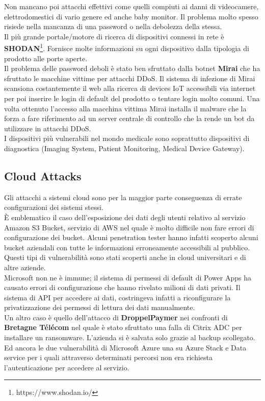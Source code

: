 Non mancano poi attacchi effettivi come quelli compiuti ai danni di videocamere, elettrodomestici di vario genere ed anche baby monitor.
Il problema molto spesso risiede nella mancanza di una password o nella debolezza della stessa.\\
Il più grande portale/motore di ricerca di dispositivi connessi in rete è \textbf{SHODAN}\footnote{https://www.shodan.io/}.
Fornisce molte informazioni su ogni dispositivo dalla tipologia di prodotto alle porte aperte.\\
Il problema delle password deboli è stato ben sfruttato dalla botnet \textbf{Mirai} che ha sfruttato le macchine vittime per attacchi \acrshort{DDoS}.
Il sistema di infezione di Mirai scansiona costantemente il web alla ricerca di devices \acrshort{IoT} accessibili via internet per poi inserire le login di default del prodotto o tentare login molto comuni.
Una volta ottenuto l'accesso alla macchina vittima Mirai installa il malware che la forza a fare riferimento ad un server centrale di controllo che la rende un bot da utilizzare in attacchi \acrshort{DDoS}.\\
I dispositivi più vulnerabili nel mondo medicale sono soprattutto dispositivi di diagnostica (Imaging System, Patient Monitoring, Medical Device Gateway).

\subsection{Cloud Attacks}
Gli attacchi a sistemi cloud sono per la maggior parte conseguenza di errate configurazioni dei sistemi stessi.\\
È emblematico il caso dell'esposizione dei dati degli utenti relativo al servizio Amazon S3 Bucket, servizio di \acrfull{AWS} nel quale è molto difficile non fare errori di configurazione dei bucket.
Alcuni penetration tester hanno infatti scoperto alcuni bucket aziendali con tutte le informazioni erroneamente accessibili al pubblico.
Questi tipi di vulnerabilità sono stati scoperti anche in cloud universitari e di altre aziende.\\
Microsoft non ne è immune; il sistema di permessi di default di Power Apps ha causato errori di configurazione che hanno rivelato milioni di dati privati.
Il sistema di \acrfull{API} per accedere ai dati, costringeva infatti a riconfigurare la privatizzazione dei permessi di lettura dei dati manualmente.\\
Un altro caso è quello dell'attacco di \textbf{DroppelPaymer} nei confronti di \textbf{Bretagne Télécom} nel quale è stato sfruttato una falla di Citrix ADC per installare un ransomware. L'azienda si è salvata solo grazie al backup scollegato.\\
Ed ancora le due vulnerabilità di Microsoft Azure una su Azure Stack e Data service per i quali attraverso determinati percorsi non era richiesta l'autenticazione per accedere al servizio.
